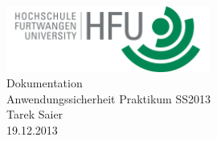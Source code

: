 \documentclass[pdftex,fontsize=11pt,a4paper]{scrbook}
\begin{document}
\begin{titlepage}
\thispagestyle{empty}
\begin{center}
\includegraphics[width=0.5\textwidth]{hfu.png}~\\[1.5cm]
\Huge Dokumentation\\[0.4cm]
\Huge Anwendungssicherheit Praktikum SS2013\\[1cm]
\LARGE Tarek Saier\\[0.2cm]
\normalsize 19.12.2013
\end{center}
\end{titlepage}
\end{document}
